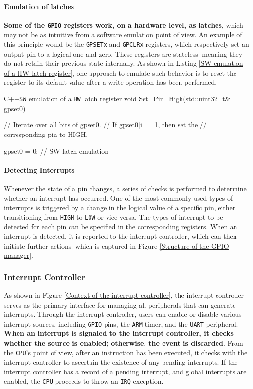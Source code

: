 \documentclass[english, ing, kiv, he, iso690numb, pdf]{fasthesis}
\begin{document}
	\paragraph{Emulation of latches}
	
	\textbf{Some of the \texttt{GPIO} registers work, on a hardware level, as latches}, which may not be as intuitive from a software emulation point of view. An example of this principle would be the \texttt{GPSETx} and \texttt{GPCLRx} registers, which respectively set an output pin to a logical one and zero. These registers are stateless, meaning they do not retain their previous state internally. As shown in Listing \ref{SW emulation of a HW latch register}, one approach to emulate such behavior is to reset the register to its default value after a write operation has been performed.
	
\begin{code}{C++}{\texttt{SW} emulation of a \texttt{HW} latch register \label{SW emulation of a HW latch register}}
void Set_Pin_High(std::uint32_t& gpset0)
{
	// Iterate over all bits of gpset0.
	// If gpset0[i]==1, then set the 
	// corresponding pin to HIGH.
	
	gpset0 = 0; // SW latch emulation
}
\end{code}
	
	\paragraph{Detecting Interrupts}
	
	Whenever the state of a pin changes, a series of checks is performed to determine whether an interrupt has occurred. One of the most commonly used types of interrupts is triggered by a change in the logical value of a specific pin, either transitioning from \texttt{HIGH} to \texttt{LOW} or vice versa. The types of interrupt to be detected for each pin can be specified in the corresponding registers. When an interrupt is detected, it is reported to the interrupt controller, which can then initiate further actions, which is captured in Figure \ref{Structure of the GPIO manager}.
	
	\newpage
	
	\subsubsection{Interrupt Controller}
	
	As shown in Figure \ref{Context of the interrupt controller}, the interrupt controller serves as the primary interface for managing all peripherals that can generate interrupts. Through the interrupt controller, users can enable or disable various interrupt sources, including \texttt{GPIO} pins, the \texttt{ARM} timer, and the \texttt{UART} peripheral. \textbf{When an interrupt is signaled to the interrupt controller, it checks whether the source is enabled; otherwise, the event is discarded}. From the \texttt{CPU}'s point of view, after an instruction has been executed, it checks with the interrupt controller to ascertain the existence of any pending interrupts. If the interrupt controller has a record of a pending interrupt, and global interrupts are enabled, the \texttt{CPU} proceeds to throw an \texttt{IRQ} exception.
	
\end{document}
